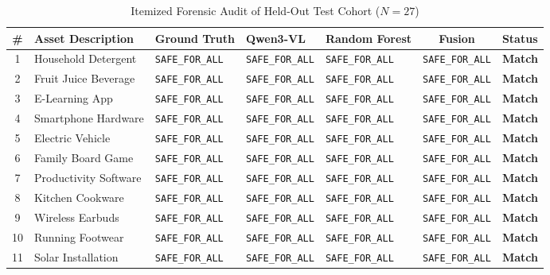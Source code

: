 \documentclass[12pt,a4paper]{report}
\begin{document}
\begin{table}[htbp]
\centering
\caption{Itemized Forensic Audit of Held-Out Test Cohort ($N=27$)}
\label{tab:test_audit_table}
\tiny
\begin{tabular}{@{}cllllcl@{}}
\toprule
\textbf{\#} & \textbf{Asset Description} & \textbf{Ground Truth} & \textbf{Qwen3-VL} & \textbf{Random Forest} & \textbf{Fusion} & \textbf{Status} \\
\midrule
1  & Household Detergent       & \texttt{SAFE\_FOR\_ALL}   & \texttt{SAFE\_FOR\_ALL}   & \texttt{SAFE\_FOR\_ALL}   & \texttt{SAFE\_FOR\_ALL}   & \textbf{Match} \\
2  & Fruit Juice Beverage      & \texttt{SAFE\_FOR\_ALL}   & \texttt{SAFE\_FOR\_ALL}   & \texttt{SAFE\_FOR\_ALL}   & \texttt{SAFE\_FOR\_ALL}   & \textbf{Match} \\
3  & E-Learning App            & \texttt{SAFE\_FOR\_ALL}   & \texttt{SAFE\_FOR\_ALL}   & \texttt{SAFE\_FOR\_ALL}   & \texttt{SAFE\_FOR\_ALL}   & \textbf{Match} \\
4  & Smartphone Hardware       & \texttt{SAFE\_FOR\_ALL}   & \texttt{SAFE\_FOR\_ALL}   & \texttt{SAFE\_FOR\_ALL}   & \texttt{SAFE\_FOR\_ALL}   & \textbf{Match} \\
5  & Electric Vehicle          & \texttt{SAFE\_FOR\_ALL}   & \texttt{SAFE\_FOR\_ALL}   & \texttt{SAFE\_FOR\_ALL}   & \texttt{SAFE\_FOR\_ALL}   & \textbf{Match} \\
6  & Family Board Game         & \texttt{SAFE\_FOR\_ALL}   & \texttt{SAFE\_FOR\_ALL}   & \texttt{SAFE\_FOR\_ALL}   & \texttt{SAFE\_FOR\_ALL}   & \textbf{Match} \\
7  & Productivity Software     & \texttt{SAFE\_FOR\_ALL}   & \texttt{SAFE\_FOR\_ALL}   & \texttt{SAFE\_FOR\_ALL}   & \texttt{SAFE\_FOR\_ALL}   & \textbf{Match} \\
8  & Kitchen Cookware          & \texttt{SAFE\_FOR\_ALL}   & \texttt{SAFE\_FOR\_ALL}   & \texttt{SAFE\_FOR\_ALL}   & \texttt{SAFE\_FOR\_ALL}   & \textbf{Match} \\
9  & Wireless Earbuds          & \texttt{SAFE\_FOR\_ALL}   & \texttt{SAFE\_FOR\_ALL}   & \texttt{SAFE\_FOR\_ALL}   & \texttt{SAFE\_FOR\_ALL}   & \textbf{Match} \\
10 & Running Footwear          & \texttt{SAFE\_FOR\_ALL}   & \texttt{SAFE\_FOR\_ALL}   & \texttt{SAFE\_FOR\_ALL}   & \texttt{SAFE\_FOR\_ALL}   & \textbf{Match} \\
11 & Solar Installation        & \texttt{SAFE\_FOR\_ALL}   & \texttt{SAFE\_FOR\_ALL}   & \texttt{SAFE\_FOR\_ALL}   & \texttt{SAFE\_FOR\_ALL}   & \textbf{Match} \\

\end{tabular}
\end{table}
\end{document}
